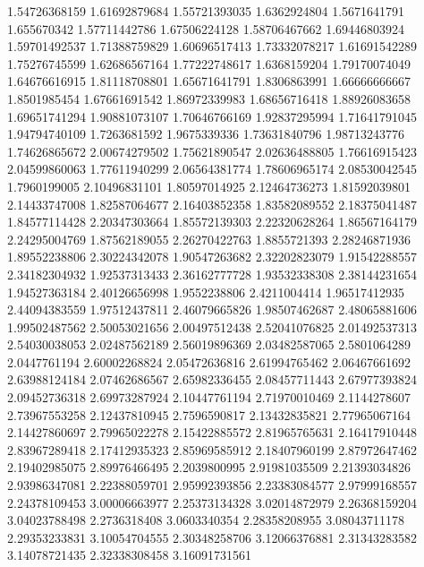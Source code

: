   1.54726368159    1.61692879684
  1.55721393035     1.6362924804
   1.5671641791      1.655670342
  1.57711442786    1.67506224128
  1.58706467662    1.69446803924
  1.59701492537    1.71388759829
  1.60696517413    1.73332078217
  1.61691542289    1.75276745599
  1.62686567164    1.77222748617
   1.6368159204    1.79170074049
  1.64676616915    1.81118708801
  1.65671641791     1.8306863991
  1.66666666667     1.8501985454
  1.67661691542    1.86972339983
  1.68656716418    1.88926083658
  1.69651741294    1.90881073107
  1.70646766169    1.92837295994
  1.71641791045    1.94794740109
   1.7263681592     1.9675339336
  1.73631840796    1.98713243776
  1.74626865672    2.00674279502
  1.75621890547    2.02636488805
  1.76616915423    2.04599860063
  1.77611940299    2.06564381774
  1.78606965174    2.08530042545
   1.7960199005    2.10496831101
  1.80597014925    2.12464736273
  1.81592039801    2.14433747008
  1.82587064677    2.16403852358
  1.83582089552    2.18375041487
  1.84577114428    2.20347303664
  1.85572139303    2.22320628264
  1.86567164179    2.24295004769
  1.87562189055    2.26270422763
   1.8855721393    2.28246871936
  1.89552238806    2.30224342078
  1.90547263682    2.32202823079
  1.91542288557    2.34182304932
  1.92537313433    2.36162777728
  1.93532338308    2.38144231654
  1.94527363184    2.40126656998
   1.9552238806     2.4211004414
  1.96517412935    2.44094383559
  1.97512437811    2.46079665826
  1.98507462687    2.48065881606
  1.99502487562    2.50053021656
  2.00497512438    2.52041076825
  2.01492537313    2.54030038053
  2.02487562189    2.56019896369
  2.03482587065     2.5801064289
   2.0447761194    2.60002268824
  2.05472636816    2.61994765462
  2.06467661692    2.63988124184
  2.07462686567    2.65982336455
  2.08457711443    2.67977393824
  2.09452736318    2.69973287924
  2.10447761194    2.71970010469
   2.1144278607    2.73967553258
  2.12437810945     2.7596590817
  2.13432835821    2.77965067164
  2.14427860697    2.79965022278
  2.15422885572    2.81965765631
  2.16417910448    2.83967289418
  2.17412935323    2.85969585912
  2.18407960199    2.87972647462
  2.19402985075    2.89976466495
   2.2039800995    2.91981035509
  2.21393034826    2.93986347081
  2.22388059701    2.95992393856
  2.23383084577    2.97999168557
  2.24378109453    3.00006663977
  2.25373134328    3.02014872979
  2.26368159204    3.04023788498
   2.2736318408     3.0603340354
  2.28358208955    3.08043711178
  2.29353233831    3.10054704555
  2.30348258706    3.12066376881
  2.31343283582    3.14078721435
  2.32338308458    3.16091731561
